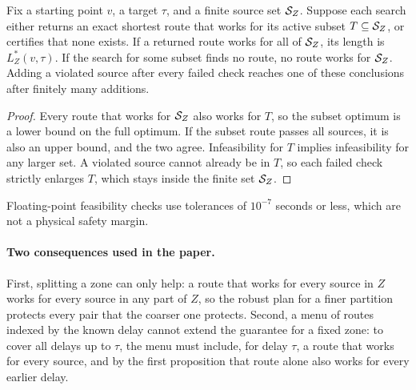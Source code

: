 \begin{proposition}
Fix a starting point $v$, a target $\tau$, and a finite source set $\mathcal{S}_Z$. Suppose each search either returns an exact shortest route that works for its active subset $T\subseteq\mathcal{S}_Z$, or certifies that none exists. If a returned route works for all of $\mathcal{S}_Z$, its length is $L_Z^*(v,\tau)$. If the search for some subset finds no route, no route works for $\mathcal{S}_Z$. Adding a violated source after every failed check reaches one of these conclusions after finitely many additions.
\end{proposition}
\begin{proof}
Every route that works for $\mathcal{S}_Z$ also works for $T$, so the subset optimum is a lower bound on the full optimum. If the subset route passes all sources, it is also an upper bound, and the two agree. Infeasibility for $T$ implies infeasibility for any larger set. A violated source cannot already be in $T$, so each failed check strictly enlarges $T$, which stays inside the finite set $\mathcal{S}_Z$.
\end{proof}
Floating-point feasibility checks use tolerances of $10^{-7}$ seconds or less, which are not a physical safety margin.

\paragraph{Two consequences used in the paper.}
First, splitting a zone can only help: a route that works for every source in $Z$ works for every source in any part of $Z$, so the robust plan for a finer partition protects every pair that the coarser one protects. Second, a menu of routes indexed by the known delay cannot extend the guarantee for a fixed zone: to cover all delays up to $\tau$, the menu must include, for delay $\tau$, a route that works for every source, and by the first proposition that route alone also works for every earlier delay.

